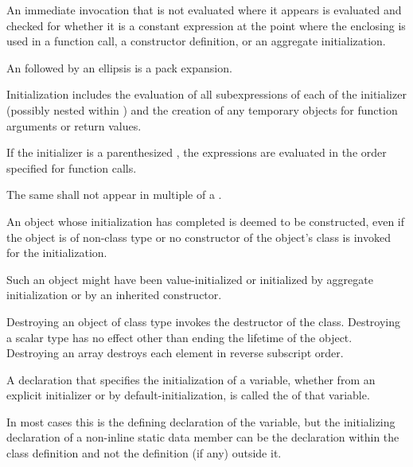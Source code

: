 \pnum
An immediate invocation that is not evaluated where
it appears
is evaluated and checked for whether it is
a constant expression at the point where
the enclosing  is used in
a function call, a constructor definition, or an aggregate initialization.

\pnum
An  followed by an ellipsis is a
pack expansion.

\pnum
Initialization includes
the evaluation of all subexpressions of
each  of
the initializer (possibly nested within ) and
the creation of any temporary objects for
function arguments or return values.

\pnum
If the initializer is a parenthesized ,
the expressions are evaluated in the order
specified for function calls.

\pnum
The same 
shall not appear in multiple  of a
.

\pnum
An object whose initialization has completed
is deemed to be constructed,
even if the object is of non-class type or
no constructor of the object's class
is invoked for the initialization.
\begin{note}
Such an object might have been value-initialized
or initialized by aggregate initialization
or by an inherited constructor.
\end{note}
Destroying an object of class type invokes the destructor of the class.
Destroying a scalar type has no effect other than
ending the lifetime of the object.
Destroying an array destroys each element in reverse subscript order.

\pnum
A declaration that specifies the initialization of a variable,
whether from an explicit initializer or by default-initialization,
is called the  of that variable.
\begin{note}
In most cases
this is the defining declaration of the variable,
but the initializing declaration
of a non-inline static data member
can be the declaration within the class definition
and not the definition (if any) outside it.
\end{note}

